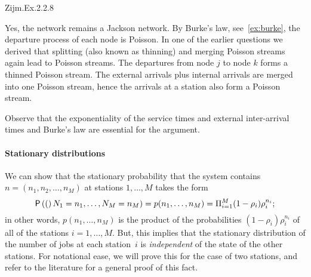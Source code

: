 \begin{exercise}
Zijm.Ex.2.2.8
\begin{solution}
 Yes, the network remains a Jackson network. By Burke's law, see~\cref{ex:burke}, the
 departure process of each node is Poisson. In one of the earlier
 questions we derived that splitting (also known as thinning) and
 merging Poisson streams again lead to Poisson streams. The
 departures from node $j$ to node $k$ forms a thinned Poisson
 stream. The external arrivals plus internal arrivals are merged into
 one Poisson stream, hence the arrivals at a station also form a Poisson stream.

 Observe that the exponentiality of the service times and external
 inter-arrival times and Burke's law are essential for the argument.
\end{solution}
\end{exercise}



\paragraph{Stationary distributions}


We can show that the stationary probability that the system contains $n=(n_1,n_2, \ldots, n_M)$ at stations $1,\ldots, M$ takes the form
\begin{equation*}
  \P(N_1=n_1, \ldots, N_M=n_M) = p(n_1,\ldots,n_M) = \Pi_{i=1}^M (1-\rho_i)\rho_i^{n_i};
\end{equation*}
in other words, $p(n_1, \ldots, n_M)$ is the product of the probabilities $(1-\rho_i)\rho_i^{n_i}$ of all of the stations $i=1,\ldots,M$.
But, this implies that the stationary distribution of the number of jobs at each station~$i$ is \emph{independent} of the state of the other stations.
For notational ease, we will prove this for the case of two stations, and refer to the literature for a general proof of this fact.












